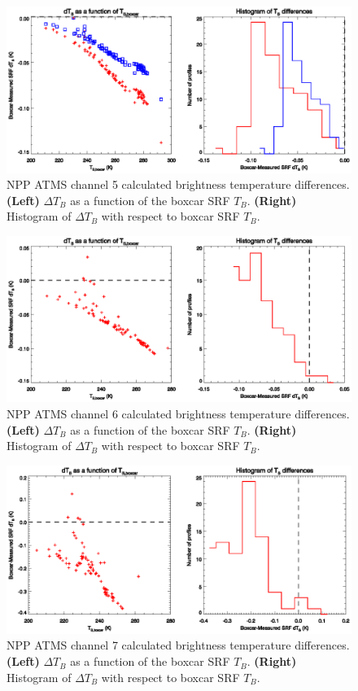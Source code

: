 \begin{figure}[H]
  \centering
  \includegraphics[scale=1]{graphics/dtb/atms_npp.ch5.TbStats.eps}
  \caption{NPP ATMS channel 5 calculated brightness temperature differences. \textbf{(Left)} $\Delta T_B$ as a function of the boxcar SRF $T_B$. \textbf{(Right)} Histogram of $\Delta T_B$ with respect to boxcar SRF $T_B$.}
  \label{fig:atms_npp.ch5.dtb}
\end{figure}

\begin{figure}[H]
  \centering
  \includegraphics[scale=1]{graphics/dtb/atms_npp.ch6.TbStats.eps}
  \caption{NPP ATMS channel 6 calculated brightness temperature differences. \textbf{(Left)} $\Delta T_B$ as a function of the boxcar SRF $T_B$. \textbf{(Right)} Histogram of $\Delta T_B$ with respect to boxcar SRF $T_B$.}
  \label{fig:atms_npp.ch6.dtb}
\end{figure}

\begin{figure}[H]
  \centering
  \includegraphics[scale=1]{graphics/dtb/atms_npp.ch7.TbStats.eps}
  \caption{NPP ATMS channel 7 calculated brightness temperature differences. \textbf{(Left)} $\Delta T_B$ as a function of the boxcar SRF $T_B$. \textbf{(Right)} Histogram of $\Delta T_B$ with respect to boxcar SRF $T_B$.}
  \label{fig:atms_npp.ch7.dtb}
\end{figure}

